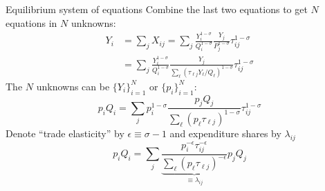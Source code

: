 \documentclass[10pt,notes=hide,aspectratio=169]{beamer}
\begin{document}
\begin{frame}{Equilibrium system of equations}
Combine the last two equations to get $N$ equations in $N$ unknowns:
\begin{align*}
Y_i 
&=
\sum_j X_{ij}
=
\sum_j \frac{Y_i^{1-\sigma}}{Q_i^{1-\sigma}} \frac{Y_j}{P_j^{1-\sigma}}\tau_{ij}^{1-\sigma}
\\
&=
\sum_j \frac{Y_i^{1-\sigma}}{Q_i^{1-\sigma}} \frac{Y_j}{\sum_{\ell} \left(\tau_{\ell j}Y_{\ell}/Q_{\ell}\right)^{1-\sigma}}\tau_{ij}^{1-\sigma}
\end{align*}
The $N$ unknowns can be $\{Y_i\}_{i=1}^{N}$ or $\{p_i\}_{i=1}^{N}$:
$$
p_i Q_i
=
\sum_j p_i^{1-\sigma} \frac{p_j Q_j}{\sum_{\ell} \left(p_{\ell} \tau_{\ell j}\right)^{1-\sigma}}\tau_{ij}^{1-\sigma}
$$
Denote ``trade elasticity'' by $\epsilon \equiv \sigma - 1$ and expenditure shares by $\lambda_{ij}$
$$
p_i Q_i
=
\sum_j \underbrace{\frac{p_i^{-\epsilon} \tau_{ij}^{-\epsilon}}{\sum_{\ell} \left(p_{\ell} \tau_{\ell j}\right)^{-\epsilon}}}_{\equiv \lambda_{ij}} p_j Q_j
$$
\end{frame}
\end{document}
